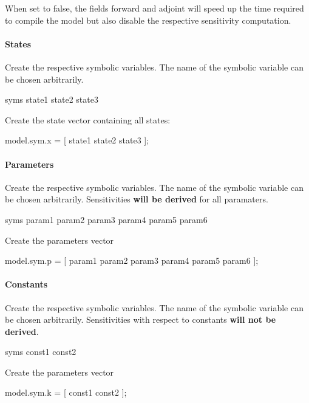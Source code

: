 When set to false, the fields \textquotesingle{}forward\textquotesingle{} and \textquotesingle{}adjoint\textquotesingle{} will speed up the time required to compile the model but also disable the respective sensitivity computation.

\paragraph*{States}

Create the respective symbolic variables. The name of the symbolic variable can be chosen arbitrarily. \begin{DoxyVerb}syms state1 state2 state3
\end{DoxyVerb}


Create the state vector containing all states\+: \begin{DoxyVerb}model.sym.x = [ state1 state2 state3 ];
\end{DoxyVerb}


\paragraph*{Parameters}

Create the respective symbolic variables. The name of the symbolic variable can be chosen arbitrarily. Sensitivities {\bfseries{will be derived}} for all paramaters. \begin{DoxyVerb}syms param1 param2 param3 param4 param5 param6
\end{DoxyVerb}


Create the parameters vector \begin{DoxyVerb}model.sym.p = [ param1 param2 param3 param4 param5 param6 ];
\end{DoxyVerb}


\paragraph*{Constants}

Create the respective symbolic variables. The name of the symbolic variable can be chosen arbitrarily. Sensitivities with respect to constants {\bfseries{will not be derived}}. \begin{DoxyVerb}syms const1 const2
\end{DoxyVerb}


Create the parameters vector \begin{DoxyVerb}model.sym.k = [ const1 const2 ];
\end{DoxyVerb}


